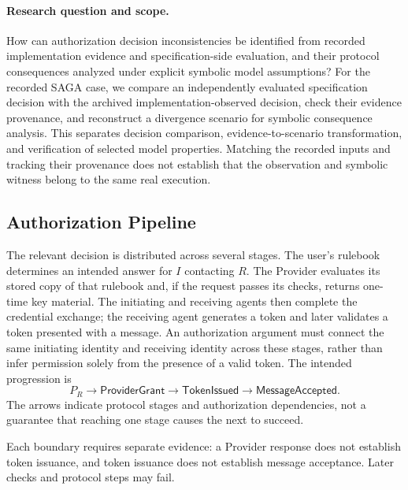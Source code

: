 \paragraph{Research question and scope.}
How can authorization decision inconsistencies be identified from recorded
implementation evidence and specification-side evaluation, and their protocol
consequences analyzed under explicit symbolic model assumptions?
For the recorded SAGA case, we compare an independently evaluated specification
decision with the archived implementation-observed decision, check their
evidence provenance, and reconstruct a divergence scenario for symbolic
consequence analysis. This separates decision comparison, evidence-to-scenario
transformation, and verification of selected model properties. Matching the
recorded inputs and tracking their provenance does not establish that the
observation and symbolic witness belong to the same real execution.


\subsection{Authorization Pipeline}

The relevant decision is distributed across several stages. The user's
rulebook determines an intended answer for $I$ contacting $R$. The Provider
evaluates its stored copy of that rulebook and, if the request passes its
checks, returns one-time key material. The initiating and receiving agents
then complete the credential exchange; the receiving agent generates a token
and later validates a token presented with a message. An authorization
argument must connect the same initiating identity and receiving identity
across these stages, rather than infer permission solely from the presence of
a valid token.
The intended progression is
\[
  P_R \longrightarrow \mathsf{ProviderGrant}
  \longrightarrow \mathsf{TokenIssued}
  \longrightarrow \mathsf{MessageAccepted}.
\]
The arrows indicate protocol stages and authorization dependencies, not a
guarantee that reaching one stage causes the next to succeed.

Each boundary requires separate evidence: a Provider response does not
establish token issuance, and token issuance does not establish message
acceptance. Later checks and protocol steps may fail.

